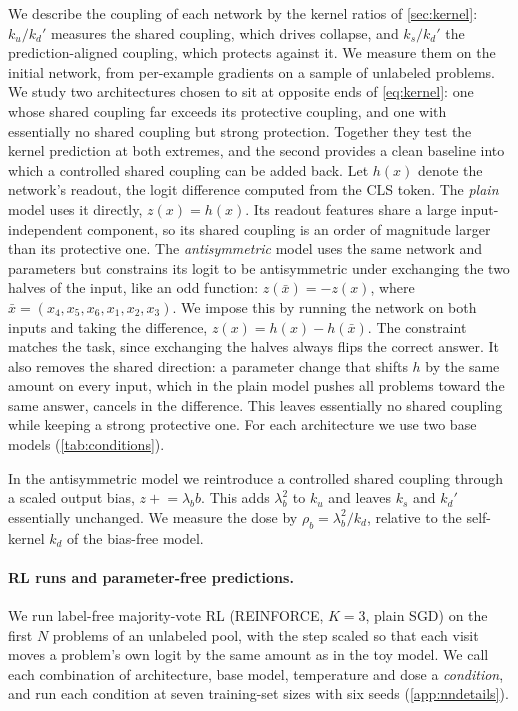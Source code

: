 We describe the coupling of each network by the kernel ratios of \cref{sec:kernel}: $k_u/k_d'$ measures the shared coupling, which drives collapse, and $k_s/k_d'$ the prediction-aligned coupling, which protects against it. We measure them on the initial network, from per-example gradients on a sample of unlabeled problems.
We study two architectures chosen to sit at opposite ends of \cref{eq:kernel}: one whose shared coupling far exceeds its protective coupling, and one with essentially no shared coupling but strong protection. Together they test the kernel prediction at both extremes, and the second provides a clean baseline into which a controlled shared coupling can be added back.
Let $h(x)$ denote the network's readout, the logit difference computed from the CLS token. The \emph{plain} model uses it directly, $z(x)=h(x)$. Its readout features share a large input-independent component, so its shared coupling is an order of magnitude larger than its protective one.
The \emph{antisymmetric} model uses the same network and parameters but constrains its logit to be antisymmetric under exchanging the two halves of the input, like an odd function: $z(\bar x)=-z(x)$, where $\bar x=(x_4,x_5,x_6,x_1,x_2,x_3)$. We impose this by running the network on both inputs and taking the difference, $z(x)=h(x)-h(\bar x)$. The constraint matches the task, since exchanging the halves always flips the correct answer. It also removes the shared direction: a parameter change that shifts $h$ by the same amount on every input, which in the plain model pushes all problems toward the same answer, cancels in the difference. This leaves essentially no shared coupling while keeping a strong protective one.
For each architecture we use two base models (\cref{tab:conditions}).

In the antisymmetric model we reintroduce a controlled shared coupling through a scaled output bias, $z\mathrel{+}=\lambda_bb$. This adds $\lambda_b^2$ to $k_u$ and leaves $k_s$ and $k_d'$ essentially unchanged.
We measure the dose by $\rho_b=\lambda_b^2/k_d$, relative to the self-kernel $k_d$ of the bias-free model.

\paragraph{RL runs and parameter-free predictions.}
We run label-free majority-vote RL (REINFORCE, $K{=}3$, plain SGD) on the first $N$ problems of an unlabeled pool, with the step scaled so that each visit moves a problem's own logit by the same amount as in the toy model.
We call each combination of architecture, base model, temperature and dose a \emph{condition}, and run each condition at seven training-set sizes with six seeds (\cref{app:nndetails}).

